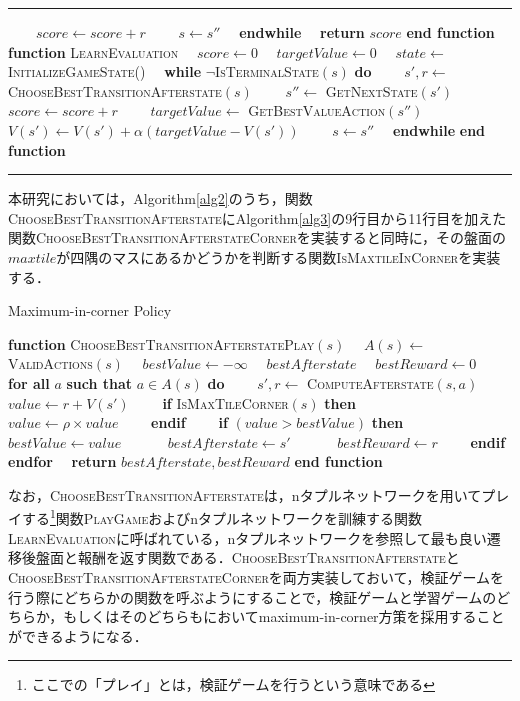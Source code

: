 \documentclass{suribt}
\makeatletter
\newenvironment{breakablealgorithm}
  {%
   \begin{center}
     \refstepcounter{algorithm}%
     \hrule height.8pt depth0pt \kern2pt%
     \renewcommand{\caption}[2][\relax]{%
       {\raggedright\textbf{\ALG@name~\thealgorithm} ##2\par}%
       \ifx\relax##1\relax %
         \addcontentsline{loa}{algorithm}{\protect\numberline{\thealgorithm}##2}%
       \else %
         \addcontentsline{loa}{algorithm}{\protect\numberline{\thealgorithm}##1}%
       \fi
       \kern2pt\hrule\kern2pt
     }
  }{%
     \kern2pt\hrule\relax%
   \end{center}
  }
\makeatother
\begin{document}
\begin{breakablealgorithm}
\begin{algorithmic}[1]
\STATE 　　$score \leftarrow score + r$
\STATE 　　$s \leftarrow s''$
\STATE 　\textbf{endwhile}
\STATE 　\textbf{return} $score$
\STATE \textbf{end function}
\STATE
\STATE \textbf{function} \textsc{LearnEvaluation}
\STATE 　$score \leftarrow 0$
\STATE 　$targetValue \leftarrow 0$
\STATE 　$state \leftarrow$ \textsc{InitializeGameState()}
\STATE 　\textbf{while } $\neg$\textsc{IsTerminalState}$(s)$ \textbf{do}
\STATE 　　$s', r \leftarrow$ \textsc{ChooseBestTransitionAfterstate}$(s)$
\STATE 　　$s'' \leftarrow $ \textsc{GetNextState}$(s')$
\STATE 　　$score \leftarrow score + r$
\STATE 　　$targetValue \leftarrow $ \textsc{GetBestValueAction}$(s'')$
\STATE 　　$V(s') \leftarrow V(s') + {\alpha}(targetValue - V(s'))$
\STATE 　　$s \leftarrow s''$
\STATE 　\textbf{endwhile}
\STATE \textbf{end function}
\end{algorithmic}
\end{breakablealgorithm}

\medskip

本研究においては，Algorithm\ref{alg2}のうち，関数\textsc{ChooseBestTransitionAfterstate}にAlgorithm\ref{alg3}の9行目から11行目を加えた関数\textsc{ChooseBestTransitionAfterstateCorner}を実装すると同時に，その盤面の$maxtile$が四隅のマスにあるかどうかを判断する関数\textsc{IsMaxtileInCorner}を実装する．

\begin{algorithm}
\caption{Maximum-in-corner Policy}
\label{alg3}
\begin{algorithmic}[1]
\STATE \textbf{function} \textsc{ChooseBestTransitionAfterstatePlay}$(s)$
\STATE 　$A(s) \leftarrow$ \textsc{ValidActions}$(s)$
\STATE 　$bestValue \leftarrow -\infty$
\STATE 　$bestAfterstate$ 
\STATE 　$bestReward \leftarrow 0$
\STATE 　\textbf{for all} $a$ \textbf{such that} $a \in A(s)$ \textbf{do}
\STATE 　　$s', r \leftarrow$ \textsc{ComputeAfterstate}$(s,a)$
\STATE 　　$value \leftarrow r + V(s')$
\STATE 　　\textbf{if} \textsc{IsMaxTileCorner}$(s)$ \textbf{then}
\STATE 　　　$value \leftarrow {\rho} \times value$
\STATE 　　\textbf{endif}
\STATE 　　\textbf{if} $(value > bestValue)$ \textbf{then}
\STATE 　　　$bestValue \leftarrow value$
\STATE 　　　$bestAfterstate \leftarrow s'$
\STATE 　　　$bestReward \leftarrow r$
\STATE 　　\textbf{endif}
\STATE 　\textbf{endfor}
\STATE 　\textbf{return} $bestAfterstate, bestReward$
\STATE \textbf{end function}
\end{algorithmic}
\end{algorithm}

なお，\textsc{ChooseBestTransitionAfterstate}は，nタプルネットワークを用いてプレイする\footnote{ここでの「プレイ」とは，検証ゲームを行うという意味である}関数\textsc{PlayGame}およびnタプルネットワークを訓練する関数\textsc{LearnEvaluation}に呼ばれている，nタプルネットワークを参照して最も良い遷移後盤面と報酬を返す関数である．\textsc{ChooseBestTransitionAfterstate}と\textsc{ChooseBestTransitionAfterstateCorner}を両方実装しておいて，検証ゲームを行う際にどちらかの関数を呼ぶようにすることで，検証ゲームと学習ゲームのどちらか，もしくはそのどちらもにおいてmaximum-in-corner方策を採用することができるようになる．
\end{document}
